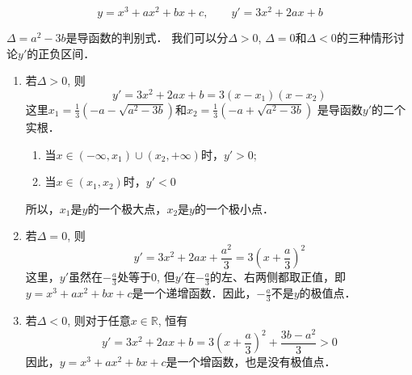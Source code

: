 \begin{solution}
\[y=x^3+ax^2+bx+c,\qquad 
    y'=3x^2+2ax+b\]

$ \Delta=a^2-3b$是导函数的判别式．
    我们可以分$\Delta>0$, $\Delta=0$和$\Delta<0$的三种情形讨论$y'$的正负区间．
\begin{enumerate}
    \item 若$\Delta>0$, 则
\[    y'=3x^2+2ax+b=3 (x-x_1) (x-x_2)\]
    这里$x_1=\frac{1}{3}\left(-a-\sqrt{a^2-3b}\right)$和$x_2=\frac{1}{3}\left(-a+\sqrt{a^2-3b}\right)$
    是导函数$y'$的二个实根．
\begin{enumerate}
    \item 当$x\in (-\infty,x_1)\cup (x_2,+\infty)$时，$y'>0$;
    \item 当$x\in (x_1,x_2)$时，$y'<0$
\end{enumerate}
    所以，$x_1$是$y$的一个极大点，$x_2$是$y$的一个极小点．
    
\item 若$\Delta=0$, 则
    \[y'=3x^2+2ax+\frac{a^2}{3}=3\left(x+\frac{a}{3}\right)^2\]
这里，$y'$虽然在$-\frac{a}{3}$处等于0, 但$y'$在$-\frac{a}{3}$的左、右两侧都取正值，即$y=x^3+ax^2+bx+c$是一个递增函数．因此，$-\frac{a}{3}$不是$y$的极值点．
\item 若$\Delta<0$, 则对于任意$x\in\mathbb{R}$, 恒有\[y'=3x^2+2ax+b=3 \left(x+\frac{a}{3}\right)^2+\frac{3b-a^2}{3}> 0\]
因此，$y=x^3+ax^2+bx+c$是一个增函数，也是没有极值点．
\end{enumerate}    
\end{solution}

